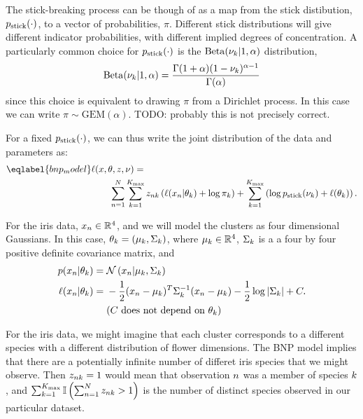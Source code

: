 The stick-breaking process can be though of as a map from  the stick
distibution, $p_{\mathrm{stick}}(\cdot)$, to a vector of probabilities, $\pi$. Different
stick distributions will give different indicator probabilities, with different
implied degrees of concentration.  A particularly common choice for
$p_{\mathrm{stick}}(\cdot)$ is the $\mathrm{Beta}(\nu_k \vert 1, \alpha)$ distribution,
%
\begin{align*}
%
\mathrm{Beta}(\nu_\k \vert 1, \alpha) =
    \frac{\Gamma(1 + \alpha) (1 - \nu_\k)^{\alpha - 1}}
         {\Gamma(\alpha)}
%
\end{align*}
%
since this choice is equivalent to drawing $\pi$ from a Dirichlet process.
In this case we can write $\pi \sim \mathrm{GEM}(\alpha)$.  TODO: probably
this is not precisely correct.

For a fixed $p_{\mathrm{stick}}(\cdot)$, we can thus write the joint distribution of
the data and parameters as:
%
\begin{align}\eqlabel{bnp_model}
%
\MoveEqLeft
\logp(\x, \theta, \z, \nu) ={}
\nonumber\\&
    \sum_{n=1}^N \sum_{k=1}^{\kmax}
        \z_{\n\k} \left(
            \logp(\x_n \vert \theta_\k) + \log \pi_\k
        \right) +
    \sum_{k=1}^{\kmax} \left(
        \log \pstick(\nu_\k) + \logp(\theta_\k)
    \right).
%
\end{align}
%

\begin{ex}
%
For the iris data, $x_n \in \mathbb{R}^4$, and we will model the clusters as
four dimensional Gaussians.  In this case, $\theta_k = (\mu_k, \Sigma_k)$,
where $\mu_k \in \mathbb{R}^4$, $\Sigma_k$ is a a four by four positive
definite covariance matrix, and
%
\begin{align*}
%
p(\x_\n \vert \theta_\k) ={}& \norm{\x_n \vert \mu_\k, \Sigma_\k} \\
\logp(\x_\n \vert \theta_\k) ={}&
    -\frac{1}{2}(\x_n - \mu_k)^T \Sigma_\k^{-1} (\x_n - \mu_k)
    -\frac{1}{2} \log |\Sigma_\k| + \const.\\
    & \constdesc{\theta_\k}
%
\end{align*}

For the iris data, we might imagine that each cluster corresponds to a different
species with a different distribution of flower dimensions.  The BNP model
implies that there are a potentially infinite number of differet iris species
that we might observe.  Then $z_{nk} = 1$ would mean that observation $n$
was a member of species $k$, and $\sum_{k=1}^{K_{\mathrm{max}}} \mathbb{I}\left( \sum_{n=1}^{N}
z_{nk} > 1\right)$ is the number of distinct species observed in our particular
dataset.
%
\end{ex}
